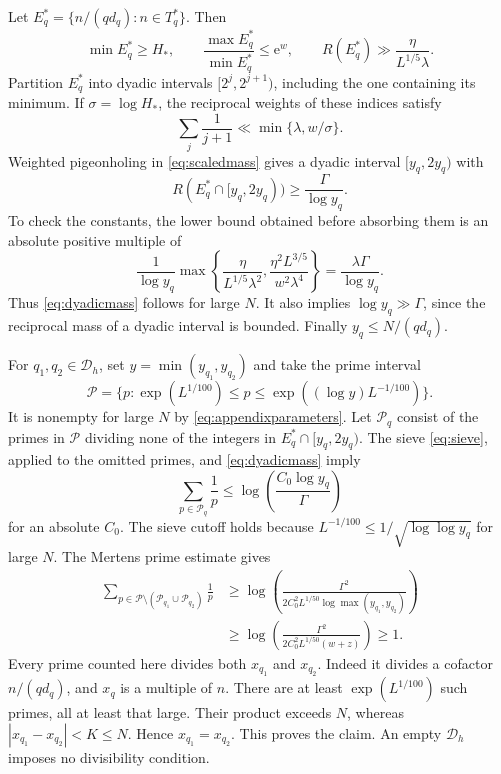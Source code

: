 \documentclass[11pt,leqno]{amsart}
\numberwithin{equation}{section}
\theoremstyle{definition}
\theoremstyle{remark}
\newcommand{\e}{\mathrm e}
\begin{document}
Let $E_q^*=\{n/(qd_q):n\in T_q^*\}$. Then
\begin{equation}\label{eq:scaledmass}
 \min E_q^*\ge H_*,\qquad
 \frac{\max E_q^*}{\min E_q^*}\le\e^w,\qquad
 R(E_q^*)\gg\frac\eta{L^{1/5}\lambda}.
\end{equation}
Partition $E_q^*$ into dyadic intervals $[2^j,2^{j+1})$, including the
one containing its minimum. If $\sigma=\log H_*$, the reciprocal
weights of these indices satisfy
\[
 \sum_j\frac1{j+1}\ll\min\{\lambda,w/\sigma\}.
\]
Weighted pigeonholing in \eqref{eq:scaledmass} gives a dyadic interval
$[y_q,2y_q)$ with
\begin{equation}\label{eq:dyadicmass}
 R(E_q^*\cap[y_q,2y_q))\ge\frac\Gamma{\log y_q}.
\end{equation}
To check the constants, the lower bound obtained before absorbing them
is an absolute positive multiple of
\[
 \frac1{\log y_q}
 \max\left\{\frac\eta{L^{1/5}\lambda^2},
             \frac{\eta^2L^{3/5}}{w^2\lambda^4}\right\}
 =\frac{\lambda\Gamma}{\log y_q}.
\]
Thus \eqref{eq:dyadicmass} follows for large $N$.
It also implies $\log y_q\gg\Gamma$, since the reciprocal mass of a
dyadic interval is bounded. Finally $y_q\le N/(qd_q)$.

For $q_1,q_2\in\mathcal D_h$, set $y=\min(y_{q_1},y_{q_2})$ and take
the prime interval
\[
 \mathcal P=\{p:\exp(L^{1/100})\le p
          \le\exp((\log y)L^{-1/100})\}.
\]
It is nonempty for large $N$ by \eqref{eq:appendixparameters}.
Let $\mathcal P_q$ consist of the primes in $\mathcal P$ dividing none
of the integers in $E_q^*\cap[y_q,2y_q)$.
The sieve \eqref{eq:sieve}, applied to the omitted primes, and
\eqref{eq:dyadicmass} imply
\[
 \sum_{p\in\mathcal P_q}\frac1p
 \le\log\left(\frac{C_0\log y_q}{\Gamma}\right)
\]
for an absolute $C_0$. The sieve cutoff holds because
$L^{-1/100}\le1/\sqrt{\log\log y_q}$ for large $N$.
The Mertens prime estimate gives
\begin{align*}
 \sum_{p\in\mathcal P\setminus(\mathcal P_{q_1}\cup\mathcal P_{q_2})}
 \frac1p
 &\ge\log\left(
 \frac{\Gamma^2}{2C_0^2 L^{1/50}
                         \log\max(y_{q_1},y_{q_2})}\right)\\
 &\ge\log\left(\frac{\Gamma^2}{2C_0^2 L^{1/50}(w+z)}\right)
 \ge1.
\end{align*}
Every prime counted here divides both $x_{q_1}$ and $x_{q_2}$.
Indeed it divides a cofactor $n/(qd_q)$, and $x_q$ is a multiple of $n$.
There are at least $\exp(L^{1/100})$ such primes, all at least that
large. Their product exceeds $N$, whereas
$|x_{q_1}-x_{q_2}|<K\le N$. Hence $x_{q_1}=x_{q_2}$.
This proves the claim. An empty $\mathcal D_h$ imposes no divisibility
condition.
\end{document}
